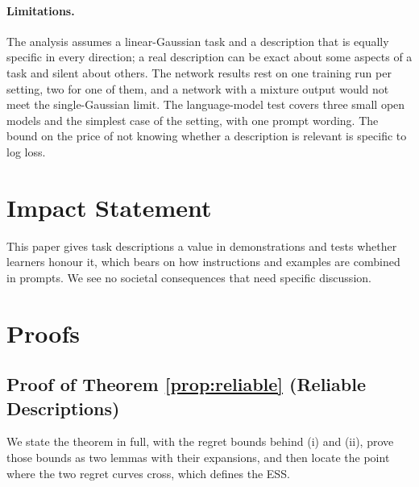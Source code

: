 \documentclass{article}
\begin{document}
\paragraph{Limitations.} The analysis assumes a linear-Gaussian task and a description that is equally specific in every direction; a real description can be exact about some aspects of a task and silent about others. The network results rest on one training run per setting, two for one of them, and a network with a mixture output would not meet the single-Gaussian limit. The language-model test covers three small open models and the simplest case of the setting, with one prompt wording. The bound on the price of not knowing whether a description is relevant is specific to log loss.

\section*{Impact Statement}
This paper gives task descriptions a value in demonstrations and tests whether learners honour it, which bears on how instructions and examples are combined in prompts. We see no societal consequences that need specific discussion.




\clearpage
\onecolumn
\appendix
\section{Proofs}

\subsection{Proof of Theorem \ref{prop:reliable} (Reliable Descriptions)}\label{app:specificity}
We state the theorem in full, with the regret bounds behind (i) and (ii), prove those bounds as two lemmas with their expansions, and then locate the point where the two regret curves cross, which defines the ESS.
\end{document}
